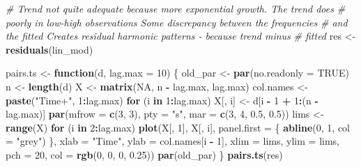 \documentclass[]{book}
\newenvironment{Shaded}{\begin{snugshade}}{\end{snugshade}}
\newcommand{\KeywordTok}[1]{\textcolor[rgb]{0.13,0.29,0.53}{\textbf{#1}}}
\newcommand{\DataTypeTok}[1]{\textcolor[rgb]{0.13,0.29,0.53}{#1}}
\newcommand{\DecValTok}[1]{\textcolor[rgb]{0.00,0.00,0.81}{#1}}
\newcommand{\FloatTok}[1]{\textcolor[rgb]{0.00,0.00,0.81}{#1}}
\newcommand{\StringTok}[1]{\textcolor[rgb]{0.31,0.60,0.02}{#1}}
\newcommand{\CommentTok}[1]{\textcolor[rgb]{0.56,0.35,0.01}{\textit{#1}}}
\newcommand{\OtherTok}[1]{\textcolor[rgb]{0.56,0.35,0.01}{#1}}
\newcommand{\ControlFlowTok}[1]{\textcolor[rgb]{0.13,0.29,0.53}{\textbf{#1}}}
\newcommand{\OperatorTok}[1]{\textcolor[rgb]{0.81,0.36,0.00}{\textbf{#1}}}
\newcommand{\NormalTok}[1]{#1}
\begin{document}
\begin{Shaded}
\begin{Highlighting}[]
\CommentTok{# Trend not quite adequate because more exponential growth.  The trend does}
\CommentTok{# poorly in low-high observations Some discrepancy between the frequencies}
\CommentTok{# and the fitted Creates residual harmonic patterns - because trend minus}
\CommentTok{# fitted}
\NormalTok{res <-}\StringTok{ }\KeywordTok{residuals}\NormalTok{(lin_mod)}

\NormalTok{pairs.ts <-}\StringTok{ }\ControlFlowTok{function}\NormalTok{(d, }\DataTypeTok{lag.max =} \DecValTok{10}\NormalTok{) \{}
\NormalTok{    old_par <-}\StringTok{ }\KeywordTok{par}\NormalTok{(}\DataTypeTok{no.readonly =} \OtherTok{TRUE}\NormalTok{)}
\NormalTok{    n <-}\StringTok{ }\KeywordTok{length}\NormalTok{(d)}
\NormalTok{    X <-}\StringTok{ }\KeywordTok{matrix}\NormalTok{(}\OtherTok{NA}\NormalTok{, n }\OperatorTok{-}\StringTok{ }\NormalTok{lag.max, lag.max)}
\NormalTok{    col.names <-}\StringTok{ }\KeywordTok{paste}\NormalTok{(}\StringTok{"Time+"}\NormalTok{, }\DecValTok{1}\OperatorTok{:}\NormalTok{lag.max)}
    \ControlFlowTok{for}\NormalTok{ (i }\ControlFlowTok{in} \DecValTok{1}\OperatorTok{:}\NormalTok{lag.max) X[, i] <-}\StringTok{ }\NormalTok{d[i }\OperatorTok{-}\StringTok{ }\DecValTok{1} \OperatorTok{+}\StringTok{ }\DecValTok{1}\OperatorTok{:}\NormalTok{(n }\OperatorTok{-}\StringTok{ }\NormalTok{lag.max)]}
    \KeywordTok{par}\NormalTok{(}\DataTypeTok{mfrow =} \KeywordTok{c}\NormalTok{(}\DecValTok{3}\NormalTok{, }\DecValTok{3}\NormalTok{), }\DataTypeTok{pty =} \StringTok{"s"}\NormalTok{, }\DataTypeTok{mar =} \KeywordTok{c}\NormalTok{(}\DecValTok{3}\NormalTok{, }\DecValTok{4}\NormalTok{, }\FloatTok{0.5}\NormalTok{, }\FloatTok{0.5}\NormalTok{))}
\NormalTok{    lims <-}\StringTok{ }\KeywordTok{range}\NormalTok{(X)}
    \ControlFlowTok{for}\NormalTok{ (i }\ControlFlowTok{in} \DecValTok{2}\OperatorTok{:}\NormalTok{lag.max) }\KeywordTok{plot}\NormalTok{(X[, }\DecValTok{1}\NormalTok{], X[, i], }\DataTypeTok{panel.first =}\NormalTok{ \{}
        \KeywordTok{abline}\NormalTok{(}\DecValTok{0}\NormalTok{, }\DecValTok{1}\NormalTok{, }\DataTypeTok{col =} \StringTok{"grey"}\NormalTok{)}
\NormalTok{    \}, }\DataTypeTok{xlab =} \StringTok{"Time"}\NormalTok{, }\DataTypeTok{ylab =}\NormalTok{ col.names[i }\OperatorTok{-}\StringTok{ }\DecValTok{1}\NormalTok{], }\DataTypeTok{xlim =}\NormalTok{ lims, }\DataTypeTok{ylim =}\NormalTok{ lims, }\DataTypeTok{pch =} \DecValTok{20}\NormalTok{, }
        \DataTypeTok{col =} \KeywordTok{rgb}\NormalTok{(}\DecValTok{0}\NormalTok{, }\DecValTok{0}\NormalTok{, }\DecValTok{0}\NormalTok{, }\FloatTok{0.25}\NormalTok{))}
    \KeywordTok{par}\NormalTok{(old_par)}
\NormalTok{\}}
\KeywordTok{pairs.ts}\NormalTok{(res)}
\end{Highlighting}
\end{Shaded}
\end{document}
